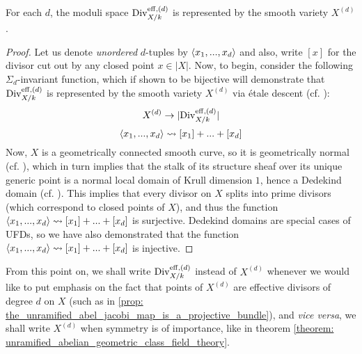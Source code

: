             \begin{proposition} \label{prop: symmetric_powers_of_curves_parametrise_divisors}
                For each $d$, the moduli space $\mathrm{Div}_{X/k}^{\mathrm{eff}, (d)}$ is represented by the smooth variety $X^{(d)}$.
            \end{proposition}
                \begin{proof}
                    Let us denote \textit{unordered} $d$-tuples by $\langle x_1, ..., x_d\rangle$ and also, write $[x]$ for the divisor cut out by any closed point $x \in |X|$. Now, to begin, consider the following $\Sigma_d$-invariant function, which if shown to be bijective will demonstrate that $\mathrm{Div}_{X/k}^{\mathrm{eff}, (d)}$ is represented by the smooth variety $X^{(d)}$ via \'etale descent (cf. \cite[\href{https://stacks.math.columbia.edu/tag/024V}{Tag 024V}]{stacks}):
                        $$X^{(d)} \to |\mathrm{Div}_{X/k}^{\mathrm{eff}, (d)}|$$
                        $$\langle x_1, ..., x_d\rangle \leadsto [x_1] + ... + [x_d]$$
                    Now, $X$ is a geometrically connected smooth curve, so it is geometrically normal (cf. \cite[\href{https://stacks.math.columbia.edu/tag/056T}{Tag 056T}]{stacks}), which in turn implies that the stalk of its structure sheaf over its unique generic point is a normal local domain of Krull dimension $1$, hence a Dedekind domain (cf. \cite[\href{https://stacks.math.columbia.edu/tag/034X}{Tag 034X}]{stacks}). This implies that every divisor on $X$ splits into prime divisors (which correspond to closed points of $X$), and thus the function $\langle x_1, ..., x_d\rangle \leadsto [x_1] + ... + [x_d]$ is surjective. Dedekind domains are special cases of UFDs, so we have also demonstrated that the function $\langle x_1, ..., x_d\rangle \leadsto [x_1] + ... + [x_d]$ is injective.
                \end{proof}
            \begin{convention}
                From this point on, we shall write $\mathrm{Div}_{X/k}^{\mathrm{eff}, (d)}$ instead of $X^{(d)}$ whenever we would like to put emphasis on the fact that points of $X^{(d)}$ are effective divisors of degree $d$ on $X$ (such as in \ref{prop: the_unramified_abel_jacobi_map_is_a_projective_bundle}), and \textit{vice versa}, we shall write $X^{(d)}$ when symmetry is of importance, like in theorem \ref{theorem: unramified_abelian_geometric_class_field_theory}.
            \end{convention}
            
